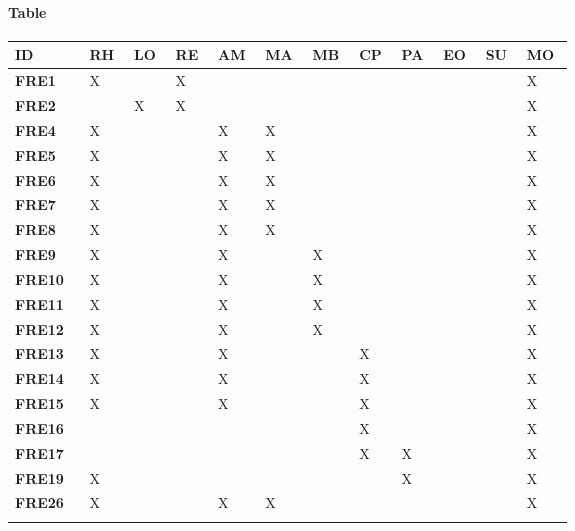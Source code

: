 \paragraph{Table}
\begin{longtable}
{| p{0.10\linewidth} |P{0.05\linewidth} | P{0.05\linewidth} | P{0.05\linewidth} | P{0.05\linewidth} | P{0.05\linewidth} | P{0.05\linewidth} |P{0.05\linewidth} |P{0.05\linewidth} |P{0.05\linewidth} |P{0.05\linewidth} |P{0.05\linewidth} |}
    \hline
    \textbf{ID} & \textbf{RH} & \textbf{LO}& \textbf{RE} & \textbf{AM}  & \textbf{MA} & \textbf{MB} & \textbf{CP} & \textbf{PA} & \textbf{EO} & \textbf{SU} & \textbf{MO}\T\B \\
    \hline 
    \hline
    \textbf{FRE1} & X & &X & & & & & & & & X\T\B\\
    \hline
    \textbf{FRE2} &  &X &X & & & & & & & & X\T\B\\
    \hline
    \textbf{FRE4} &X  & & &X &X & & & & & & X\T\B\\
    \hline
    \textbf{FRE5} &X  & & &X &X & & & & & & X\T\B\\
    \hline
    \textbf{FRE6} &X  & & &X &X & & & & & & X\T\B\\
    \hline
    \textbf{FRE7} &X  & & &X &X & & & & & & X\T\B\\
    \hline
    \textbf{FRE8} &X  & & &X &X & & & & & & X\T\B\\
    \hline
    \textbf{FRE9} &X  & & &X & &X & & & & & X\T\B\\
    \hline
    \textbf{FRE10} &X  & & &X & &X & & & & & X\T\B\\
    \hline
    \textbf{FRE11} &X  & & &X & &X & & & & & X\T\B\\
    \hline
    \textbf{FRE12} &X  & & &X & &X & & & & & X\T\B\\
    \hline
    \textbf{FRE13} &X  & & &X & & &X & & & & X\T\B\\
    \hline
    \textbf{FRE14} &X  & & &X & & &X & & & & X\T\B\\
    \hline
    \textbf{FRE15} &X  & & &X & & &X & & & & X\T\B\\
    \hline
    \textbf{FRE16} &  & & & & & &X & & & & X\T\B\\
    \hline
    \textbf{FRE17} &  & & & & & &X &X & & &X\T\B\\
    \hline
    \textbf{FRE19} &X  & & & & & & &X & & &X\T\B\\
    \hline
    \textbf{FRE26} &X  & & &X &X & & & & & &X\T\B\\
    \hhline{============}

\end{longtable}
